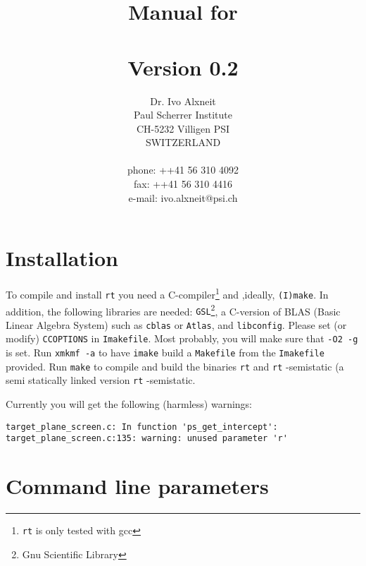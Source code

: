 \documentclass[10pt,a4paper,titlepage]{article}
\title{ {\Huge Manual for \\
		\rt \\
		Version 0.2\\
		\vspace{2cm}}}
\author{Dr. Ivo Alxneit \\
	Paul Scherrer Institute \\
	CH-5232 Villigen PSI \\
	SWITZERLAND \\
	\\
	phone: ++41 56 310 4092 \\
	fax: ++41 56 310 4416 \\
	e-mail: ivo.alxneit@psi.ch \\
	\vspace{4cm}}
\newcommand{\rt}{{\tt rt} }
\begin{document}
\maketitle

\tableofcontents
\pagebreak

\setcounter{page}{1}



\section{Installation}

To compile and install \rt you need a C-compiler\footnote{\rt is only tested with gcc} and ,ideally, {\tt (I)make}. In addition, the following libraries are needed: {\tt GSL}\footnote{Gnu Scientific Library}, a C-version of BLAS (Basic Linear Algebra System) such as {\tt cblas} or {\tt Atlas}, and {\tt libconfig}. Please set (or modify) {\tt CCOPTIONS} in {\tt Imakefile}. Most probably, you will make sure that {\tt -O2 -g} is set. Run {\tt xmkmf -a} to have {\tt imake} build a {\tt Makefile} from the {\tt Imakefile} provided. Run {\tt make} to compile and build the binaries \rt and {\rt-semistatic} (a semi statically linked version {\rt-semistatic}.

Currently you will get the following (harmless) warnings:

\begin{verbatim}
target_plane_screen.c: In function 'ps_get_intercept':
target_plane_screen.c:135: warning: unused parameter 'r'
\end{verbatim}



\section{Command line parameters}
\end{document}

